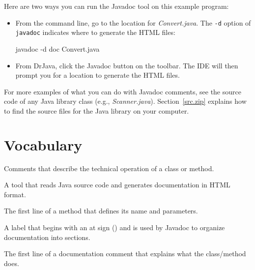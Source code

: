 Here are two ways you can run the Javadoc tool on this example program:

\begin{itemize}


\item From the command line, go to the location for {\it Convert.java}.
The {\tt -d} option of {\tt javadoc} indicates where to generate the HTML files:

\begin{stdout}
javadoc -d doc Convert.java
\end{stdout}

\item From DrJava, click the {\sf Javadoc} button on the toolbar.
The IDE will then prompt you for a location to generate the HTML files.

\end{itemize}

For more examples of what you can do with Javadoc comments, see the source code of any Java library class (e.g., {\it Scanner.java}).
Section~\ref{src.zip} explains how to find the source files for the Java library on your computer.


\section{Vocabulary}
\label{javadoc_vocabulary}

\begin{description}

Comments that describe the technical operation of a class or method.

A tool that reads Java source code and generates documentation in HTML format.

The first line of a method that defines its name and parameters.

A label that begins with an at sign () and is used by Javadoc to organize documentation into sections.

The first line of a documentation comment that explains what the class/method does.

\end{description}
